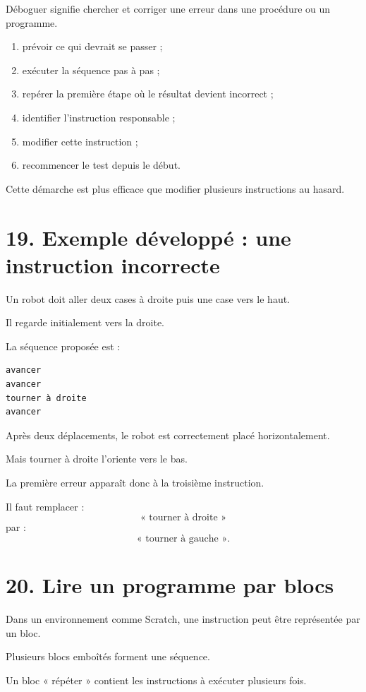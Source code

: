Déboguer signifie chercher et corriger une erreur dans une procédure ou un programme.

\begin{methode}
\begin{enumerate}
\item prévoir ce qui devrait se passer ;
\item exécuter la séquence pas à pas ;
\item repérer la première étape où le résultat devient incorrect ;
\item identifier l'instruction responsable ;
\item modifier cette instruction ;
\item recommencer le test depuis le début.
\end{enumerate}
\end{methode}

Cette démarche est plus efficace que modifier plusieurs instructions au hasard.

\section{19. Exemple développé : une instruction incorrecte}

Un robot doit aller deux cases à droite puis une case vers le haut.

Il regarde initialement vers la droite.

La séquence proposée est :
\begin{verbatim}
avancer
avancer
tourner à droite
avancer
\end{verbatim}

Après deux déplacements, le robot est correctement placé horizontalement.

Mais tourner à droite l'oriente vers le bas.

La première erreur apparaît donc à la troisième instruction.

Il faut remplacer :
\[
\text{« tourner à droite »}
\]
par :
\[
\text{« tourner à gauche »}.
\]

\section{20. Lire un programme par blocs}

Dans un environnement comme Scratch, une instruction peut être représentée par un bloc.

Plusieurs blocs emboîtés forment une séquence.

Un bloc « répéter » contient les instructions à exécuter plusieurs fois.


